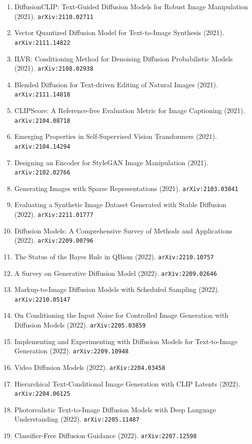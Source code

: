 \documentclass[11pt]{article}
\begin{document}
\begin{enumerate}
  \item DiffusionCLIP: Text-Guided Diffusion Models for Robust Image Manipulation (2021). \texttt{arXiv:2110.02711}
  \item Vector Quantized Diffusion Model for Text-to-Image Synthesis (2021). \texttt{arXiv:2111.14822}
  \item ILVR: Conditioning Method for Denoising Diffusion Probabilistic Models (2021). \texttt{arXiv:2108.02938}
  \item Blended Diffusion for Text-driven Editing of Natural Images (2021). \texttt{arXiv:2111.14818}
  \item CLIPScore: A Reference-free Evaluation Metric for Image Captioning (2021). \texttt{arXiv:2104.08718}
  \item Emerging Properties in Self-Supervised Vision Transformers (2021). \texttt{arXiv:2104.14294}
  \item Designing an Encoder for StyleGAN Image Manipulation (2021). \texttt{arXiv:2102.02766}
  \item Generating Images with Sparse Representations (2021). \texttt{arXiv:2103.03841}
  \item Evaluating a Synthetic Image Dataset Generated with Stable Diffusion (2022). \texttt{arXiv:2211.01777}
  \item Diffusion Models: A Comprehensive Survey of Methods and Applications (2022). \texttt{arXiv:2209.00796}
  \item The Status of the Bayes Rule in QBism (2022). \texttt{arXiv:2210.10757}
  \item A Survey on Generative Diffusion Model (2022). \texttt{arXiv:2209.02646}
  \item Markup-to-Image Diffusion Models with Scheduled Sampling (2022). \texttt{arXiv:2210.05147}
  \item On Conditioning the Input Noise for Controlled Image Generation with Diffusion Models (2022). \texttt{arXiv:2205.03859}
  \item Implementing and Experimenting with Diffusion Models for Text-to-Image Generation (2022). \texttt{arXiv:2209.10948}
  \item Video Diffusion Models (2022). \texttt{arXiv:2204.03458}
  \item Hierarchical Text-Conditional Image Generation with CLIP Latents (2022). \texttt{arXiv:2204.06125}
  \item Photorealistic Text-to-Image Diffusion Models with Deep Language Understanding (2022). \texttt{arXiv:2205.11487}
  \item Classifier-Free Diffusion Guidance (2022). \texttt{arXiv:2207.12598}

\end{enumerate}
\end{document}
